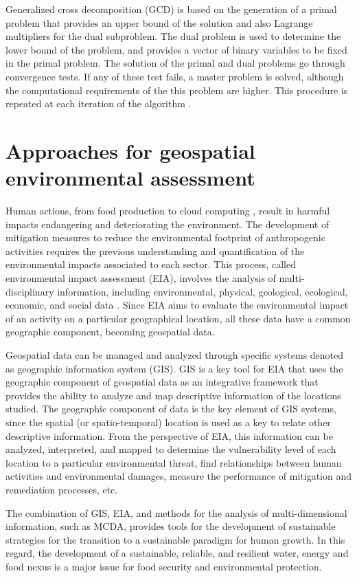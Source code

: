 \begin{refsection}[referencesCh1]
Generalized cross decomposition (GCD) is based on the generation of a primal problem that provides an upper bound of the solution and also Lagrange multipliers for the dual subproblem. The dual problem is used to determine the lower bound of the problem, and provides a vector of binary variables to be fixed in the primal problem. The solution of the primal and dual problems go through convergence tests. If any of these test fails, a master problem is solved, although the computational requirements of the this problem are higher. This procedure is repeated at each iteration of the algorithm \citep{floudas1995nonlinear}.

\section{Approaches for geospatial environmental assessment}
Human actions, from food production\citep{foster2007environmental} to cloud computing \citep{di2017can}, result in harmful impacts endangering and deteriorating the environment. The development of mitigation measures to reduce the environmental footprint of anthropogenic activities requires the previous understanding and quantification of the environmental impacts associated to each sector. This process, called environmental impact assessment (EIA), involves the analysis of multi-disciplinary information, including environmental, physical, geological, ecological, economic, and social data \citep{gharehbaghi2018gis}. Since EIA aims to evaluate the environmental impact of an activity on a particular geographical location, all these data have a common geographic component, becoming geospatial data.

Geospatial data can be managed and analyzed through specific systems denoted as geographic information system (GIS). GIS is a key tool for EIA that uses the geographic component of geospatial data as an integrative framework that provides the ability to analyze and map descriptive information of the locations studied. The geographic component of data is the key element of GIS systems, since the spatial (or spatio-temporal) location is used as a key to relate other descriptive information. From the perspective of EIA, this information can be analyzed, interpreted, and mapped to determine the vulnerability level of each location to a particular environmental threat, find relationships between human activities and environmental damages, measure the performance of mitigation and remediation processes, etc.

The combination of GIS, EIA, and methods for the analysis of multi-dimensional information, such as MCDA, provides tools for the development of sustainable strategies for the transition to a sustainable paradigm for human growth. In this regard, the development of a sustainable, reliable, and resilient water, energy and food nexus is a major issue for food security and environmental protection.


\end{refsection}
